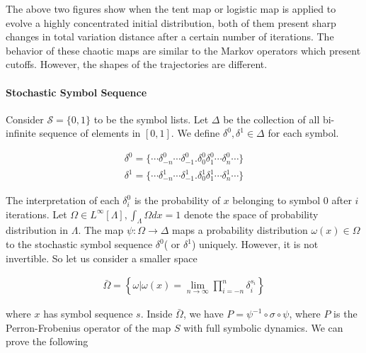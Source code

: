 \documentclass[landscape,a0b,final]{a0poster}
\newenvironment{poster}{
  \begin{center}
  \begin{minipage}[c]{0.98\textwidth}
}{
  \end{minipage} 
  \end{center}
}
\newenvironment{pcolumn}[1]{
  \begin{minipage}{#1\textwidth}
  \begin{center}
}{
  \end{center}
  \end{minipage}
}
\begin{document}
\begin{poster}
\begin{center}
\begin{pcolumn}{0.32}
{\vspace{0.5cm}
The above two figures show when the tent map or logistic map is applied to evolve a highly concentrated initial distribution, both of them present sharp changes in total variation distance after a certain number of iterations. The behavior of these chaotic maps are similar to the Markov operators which present cutoffs. However, the shapes of the trajectories are different. 

\vspace{-0.5cm}
\paragraph{Stochastic Symbol Sequence}
Consider $\mathcal{S}=\{0, 1\}$ to be the symbol lists. Let $\Delta$ be the collection of all bi-infinite sequence of elements in $[0,1]$. We define $\delta^0 , \delta^1 \in \Delta$ for each symbol.
\vspace{-1.5cm}

 \begin{eqnarray}
 \delta^0 = \{\cdots \delta_{-n}^0\cdots \delta_{-1}^0.\delta_0^0 \delta_1^0\cdots \delta_n^0\cdots\} \nonumber\\
 \delta^1 = \{\cdots \delta_{-n}^1\cdots \delta_{-1}^1.\delta_0^1 \delta_1^1\cdots \delta_n^1\cdots\}
 \end{eqnarray}
\vspace{-1.6cm}

The interpretation of each $\delta_i^0$ is the probability of $x$ belonging to symbol $0$ after $i$ iterations.
Let $\Omega\in L^\infty[\Lambda], \int_\Lambda \Omega dx=1$ denote the space of probability distribution in $\Lambda$. The map $\psi: \Omega \rightarrow \Delta $ maps a probability distribution $\omega(x) \in \Omega$ to the stochastic symbol sequence $\delta^0$( or $\delta^1$) uniquely. However, it is not invertible. So let us consider a smaller space
\vspace{-1.2cm}

  \begin{eqnarray}
  \bar{\Omega} = \left\{ \omega | \omega(x) = \lim_{n \rightarrow \infty} \prod_{i=-n}^n \delta^{s_i}_i \right\}
  \end{eqnarray}
\vspace{-1.2cm}

where $x$ has symbol sequence $s$. Inside $\bar{\Omega}$, we have $P= \psi^{-1}\circ \sigma \circ \psi$, where $P$ is the Perron-Frobenius operator of the map $S$ with full symbolic dynamics. We can prove the following

}
\end{pcolumn}
\end{center}
\end{poster}
\end{document}
